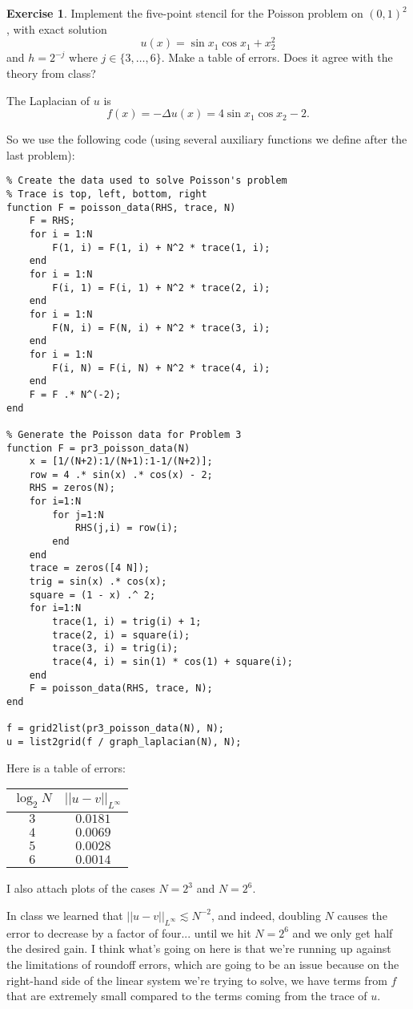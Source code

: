 \documentclass[10pt]{article}
\theoremstyle{definition}
\newtheorem{exer}{Exercise}
\begin{document}
\begin{exer}
Implement the five-point stencil for the Poisson problem on $(0, 1)^2$, with exact solution
$$u(x) = \sin x_1 \cos x_1 + x_2^2$$
and $h = 2^{-j}$ where $j \in \{3, \dots, 6\}$. Make a table of errors.
Does it agree with the theory from class?
\end{exer}

The Laplacian of $u$ is
$$f(x) = -\Delta u(x) = 4 \sin x_1 \cos x_2 - 2.$$

So we use the following code (using several auxiliary functions we define after the last problem):
\begin{verbatim}
% Create the data used to solve Poisson's problem
% Trace is top, left, bottom, right
function F = poisson_data(RHS, trace, N)
    F = RHS;
    for i = 1:N
        F(1, i) = F(1, i) + N^2 * trace(1, i);
    end
    for i = 1:N
        F(i, 1) = F(i, 1) + N^2 * trace(2, i);
    end
    for i = 1:N
        F(N, i) = F(N, i) + N^2 * trace(3, i);
    end
    for i = 1:N
        F(i, N) = F(i, N) + N^2 * trace(4, i);
    end
    F = F .* N^(-2);
end

% Generate the Poisson data for Problem 3
function F = pr3_poisson_data(N)
    x = [1/(N+2):1/(N+1):1-1/(N+2)];
    row = 4 .* sin(x) .* cos(x) - 2;
    RHS = zeros(N);
    for i=1:N
        for j=1:N
            RHS(j,i) = row(i);
        end
    end
    trace = zeros([4 N]);
    trig = sin(x) .* cos(x);
    square = (1 - x) .^ 2;
    for i=1:N
        trace(1, i) = trig(i) + 1;
        trace(2, i) = square(i);
        trace(3, i) = trig(i);
        trace(4, i) = sin(1) * cos(1) + square(i);
    end
    F = poisson_data(RHS, trace, N);
end

f = grid2list(pr3_poisson_data(N), N);
u = list2grid(f / graph_laplacian(N), N);
\end{verbatim}

Here is a table of errors:
\begin{center}\begin{tabular}{c | c}
$\log_2 N$ & $||u - v||_{L^\infty}$ \\
\hline
 $3$ & $0.0181$ \\
$4$ & $0.0069$ \\
$5$ & $0.0028$ \\
$6$ & $0.0014$
\end{tabular}\end{center}
I also attach plots of the cases $N = 2^3$ and $N = 2^6$.

In class we learned that $||u - v||_{L^\infty} \lesssim N^{-2}$, and indeed, doubling $N$ causes the error to decrease by a factor of four... until we hit $N = 2^6$ and we only get half the desired gain. I think what's going on here is that we're running up against the limitations of roundoff errors, which are going to be an issue because on the right-hand side of the linear system we're trying to solve, we have terms from $f$ that are extremely small compared to the terms coming from the trace of $u$.
\end{document}
